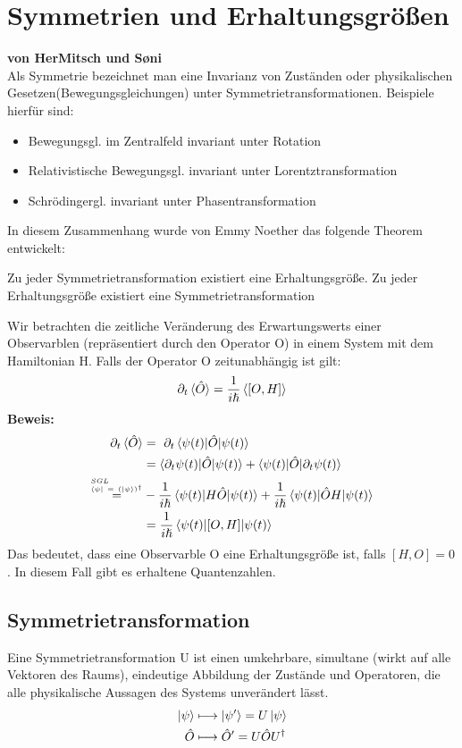 \documentclass[Ex4_Zusammenfassung.tex]{subfiles}
\begin{document}
\chapter{Symmetrien und Erhaltungsgrößen}
\textbf{von HerMitsch und S\o{}ni} \\ \newline
Als Symmetrie bezeichnet man eine Invarianz von Zuständen oder physikalischen Gesetzen(Bewegungsgleichungen) unter Symmetrietransformationen.
Beispiele hierfür sind:
\begin{itemize}
\item Bewegungsgl. im Zentralfeld invariant unter Rotation
\item Relativistische Bewegungsgl. invariant unter Lorentztransformation
\item Schrödingergl. invariant unter Phasentransformation
\end{itemize}
In diesem Zusammenhang wurde von Emmy Noether das folgende Theorem entwickelt:
\begin{tcolorbox}[title= Noether-Theorem,colback=red!50!white]
Zu jeder Symmetrietransformation existiert eine Erhaltungsgröße. \newline
Zu jeder Erhaltungsgröße existiert eine Symmetrietransformation
\end{tcolorbox}

Wir betrachten die zeitliche Veränderung des Erwartungswerts einer Observarblen (repräsentiert durch den Operator O) in einem System mit dem Hamiltonian H. Falls der Operator O zeitunabhängig ist gilt:
\begin{equation}
\partial_t \braket{\hat{O}} = \frac{1}{i\hslash} \braket{[O,H]}
\end{equation}
\textbf{Beweis:}
	\begin{align*}
	\partial_t \braket{\hat{O}} &= \ \partial_t \braket{\psi(t)|\hat{O}|\psi(t)} \\ 
	&=\braket{\partial_t \psi(t)|\hat{O}|\psi(t)} + \braket{\psi(t)|\hat{O}|\partial_t \psi(t)} \\ \stackrel{^{SGL}_{\bra{\psi} \  = \ (\ket{\psi})^{\dag}}}{=} &-\frac{1}{i\hslash} \braket{\psi(t)|H\hat{O}|\psi(t)} + \frac{1}{i\hslash} \braket{\psi(t)|\hat{O} H |\psi(t)} \\ 
	&= \frac{1}{i\hslash} \braket{\psi(t)|[O,H]|\psi(t)}
	\end{align*}
Das bedeutet, dass eine Observarble O eine Erhaltungsgröße ist, falls $[H,O] = 0$.  In diesem Fall gibt es erhaltene Quantenzahlen. 
\section{Symmetrietransformation}
Eine Symmetrietransformation U ist einen umkehrbare, simultane (wirkt auf alle Vektoren des Raums), eindeutige Abbildung der Zustände und Operatoren, die alle physikalische Aussagen des Systems unverändert lässt.
\begin{align}
\ket{\psi} &\longmapsto \ket{\psi'} = U \ket{\psi} \\
\hat{O} &\longmapsto \hat{O}' = U \hat{O} U^{\dag}
\end{align}
\end{document}

